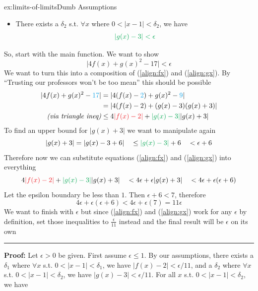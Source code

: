 \documentclass[landscape, 8pt]{extarticle}
\begin{document}
\begin{multicols}{3}
\begin{xmp}{ex:limits-of-limits}{Dumb Assumptions}
\begin{itemize}
        \item There exists a $\delta_{2}$ s.t. $\forall x$ where $0<\lvert x-1\rvert < \delta_{2}$, we have 
        \begin{align}{\color{colour2}
            \lvert g(x) - 3\rvert < \epsilon \label{align:gx}
        }\end{align}
    \end{itemize}
    So, start with the main function. We want to show
    \[\lvert 4f(x) + g(x)^{2} - 17 \rvert < \epsilon\]
    We want to turn this into a composition of (\ref{align:fx}) and (\ref{align:gx}). By ``Trusting our professors won't be too mean'' this should be possible
    \[\begin{aligned}
        \lvert 4f(x)+g(x)^{2} - {\color{colour3}17} \rvert &= \lvert 4(f(x)-{\color{colour3}2}) + g(x)^{2}-{\color{colour3}9}\rvert \\
        &= \lvert 4(f(x)-2) + (g(x)-3)(g(x)+3)\rvert \\
        \text{\textit{(via triangle ineq)}} &\le 4{\color{colour1}\lvert f(x)-2\rvert} + {\color{colour2}\lvert g(x)-3\rvert} \lvert g(x)+3\rvert \\
    \end{aligned}\]
    To find an upper bound for $\lvert g(x) + 3\rvert$ we want to manipulate again
    \[\lvert g(x) + 3\rvert = \lvert g(x) - 3 + 6\rvert \quad\le {\color{colour2}\lvert g(x) - 3\rvert} + 6 \quad< \epsilon + 6\]
    Therefore now we can substitute equations (\ref{align:fx}) and (\ref{align:gx}) into everything
    \[4{\color{colour1}\lvert f(x)-2\rvert} + {\color{colour2}\lvert g(x)-3\rvert} \lvert g(x)+3\rvert \quad< 4\epsilon + \epsilon \lvert g(x) + 3\rvert \quad< 4\epsilon + \epsilon(\epsilon+6)\]
    Let the epsilon boundary be less than $1$. Then $\epsilon + 6 < 7$, therefore
    \[4\epsilon + \epsilon(\epsilon + 6) < 4\epsilon + \epsilon(7) = 11\epsilon\]
    We want to finish with $\epsilon$ but since (\ref{align:fx}) and (\ref{align:gx}) work for any $\epsilon$ by definition, set those inequalities to $\frac{\epsilon}{11}$ instead and the final result will be $\epsilon$ on its own
    \vspace{3pt}
    \hrule
    \vspace{3pt}
    \noindent\textbf{Proof:} Let $\epsilon > 0$ be given. First assume $\epsilon\le 1$. By our assumptions, there exists a $\delta_{1}$ where $\forall x$ s.t. $0<\lvert x-1\rvert < \delta_{1}$, we have $\lvert f(x) - 2\rvert < {\epsilon}/{11}$, and a $\delta_{2}$ where $\forall x$ s.t. $0<\lvert x-1\rvert < \delta_{2}$, we have $\lvert g(x) - 3\rvert < {\epsilon}/{11}$. For all $x$ s.t. $0<\lvert x-1\rvert < \delta_{2}$, we have

\end{xmp}
\end{multicols}
\end{document}
